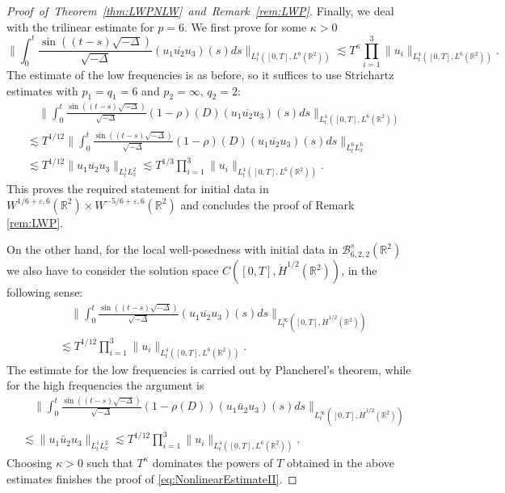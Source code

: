 \documentclass{amsart}
\theoremstyle{definition}
\newcommand{\R}{\mathbb{R}}
\newcommand {\Rtwo}{\mathbb{R}^{2}}
\newcommand {\veps}{\varepsilon}
\numberwithin{equation}{section}
\begin{document}
\begin{proof}[Proof~of~Theorem~\ref{thm:LWPNLW}~and~Remark~\ref{rem:LWP}]
Finally, we deal with the trilinear estimate for $p=6$. We first prove for some $\kappa > 0$
\begin{equation}
\label{eq:NonlinearEstimateII}
\Big\| \int_0^t \frac{\sin((t-s) \sqrt{-\Delta})}{\sqrt{-\Delta}} (u_{1}\overline{u_{2}} u_{3})(s) ds \Big\|_{L_t^4([0,T],L^6(\Rtwo))}\lesssim T^{\kappa} \prod_{i=1}^{3}\|u_{i}\|_{L^{4}_{t}([0,T],L^{6}(\Rtwo))}.
\end{equation}
The estimate of the low frequencies is as before, so it suffices to use Strichartz estimates with $p_1 = q_1 = 6$ and $p_2 = \infty$, $q_2 = 2$:
\begin{equation*}
\begin{split}
&\quad \Big\| \int_0^t \frac{\sin((t-s) \sqrt{- \Delta})}{\sqrt{-\Delta}} (1-\rho)(D) (u_1 \overline{u_2} u_3)(s) ds \Big\|_{L_t^4([0,T], L^6(\Rtwo))} \\
&\lesssim T^{1/12} \Big\| \int_0^t \frac{\sin((t-s) \sqrt{- \Delta})}{\sqrt{-\Delta}} (1-\rho)(D) (u_1 \overline{u_2} u_3)(s) ds \Big\|_{L_t^6L^6_{x}} \\
&\lesssim T^{1/12} \| u_1 \overline{u_2} u_3 \|_{L_t^1 L^2_{x}} \lesssim T^{1/3} \prod_{i=1}^3 \| u_i \|_{L_t^4([0,T], L^6(\Rtwo))}.
\end{split}
\end{equation*}
This proves the required statement for initial data in $W^{1/6+\veps,6}(\R^{2})\times W^{-5/6+\veps,6}(\Rtwo)$ and concludes the proof of Remark \ref{rem:LWP}.

On the other hand, for the local well-posedness with initial data in $\mathcal{B}^{s}_{6,2,2}(\Rtwo)$ we also have to consider the solution space $C([0,T],\dot{H}^{1/2}(\Rtwo))$, in the following sense:
\begin{align*}
&\quad \Big\| \int_0^t \frac{\sin((t-s) \sqrt{- \Delta})}{\sqrt{- \Delta}} (u_1 \overline{u_2} u_3)(s) ds \Big\|_{L_t^\infty([0,T], \dot{H}^{1/2}(\Rtwo))}\\
&\lesssim T^{1/12} \prod_{i=1}^3 \| u_i \|_{L_t^4([0,T], L^6(\Rtwo))}.
\end{align*}
The estimate for the low frequencies is carried out by Plancherel's theorem, while for the high frequencies the argument is
\begin{equation*}
\begin{split}
&\quad\Big\| \int_0^t \frac{\sin((t-s) \sqrt{- \Delta})}{\sqrt{- \Delta}} (1-\rho(D)) (u_1 \bar{u}_2 u_3)(s) ds \Big\|_{L_t^\infty([0,T],\dot{H}^{1/2}(\Rtwo))} \\
&\lesssim \| u_1 \bar{u}_2 u_3 \|_{L_t^1 L_x^2}\lesssim T^{1/12} \prod_{i=1}^3 \| u_i \|_{L_t^4([0,T], L^6(\Rtwo))}.
\end{split}
\end{equation*}
Choosing $\kappa > 0$ such that $T^\kappa$ dominates the powers of $T$ obtained in the above estimates finishes the proof of \eqref{eq:NonlinearEstimateII}.
\end{proof}
\end{document}
